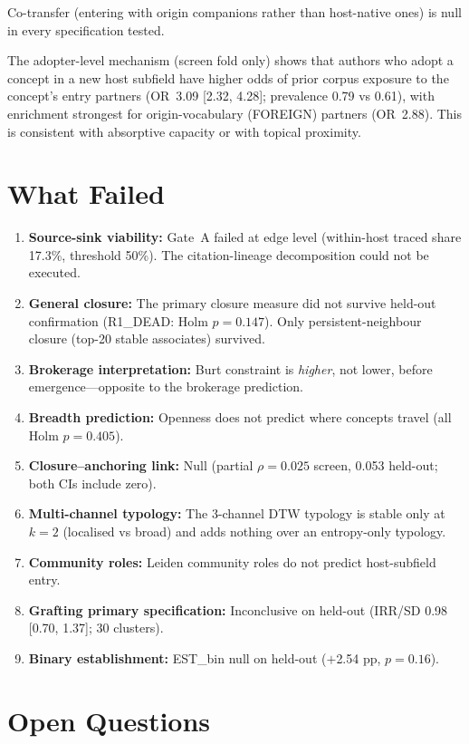 \documentclass[11pt,letterpaper]{article}
\begin{document}
Co-transfer (entering with origin companions rather than host-native ones) is null in every specification tested.

The adopter-level mechanism (screen fold only) shows that authors who adopt a concept in a new host subfield have higher odds of prior corpus exposure to the concept's entry partners (OR~3.09 [2.32, 4.28]; prevalence 0.79 vs 0.61), with enrichment strongest for origin-vocabulary (FOREIGN) partners (OR~2.88). This is consistent with absorptive capacity or with topical proximity.

\section*{What Failed}

\begin{enumerate}
\setlength{\itemsep}{2pt}
\emergencystretch=1em
\item \textbf{Source-sink viability:} Gate~A failed at edge level (within-host traced share 17.3\%, threshold 50\%). The citation-lineage decomposition could not be executed.
\item \textbf{General closure:} The primary closure measure did not survive held-out confirmation (R1\_DEAD: Holm $p = 0.147$). Only persistent-neighbour closure (top-20 stable associates) survived.
\item \textbf{Brokerage interpretation:} Burt constraint is \emph{higher}, not lower, before emergence---opposite to the brokerage prediction.
\item \textbf{Breadth prediction:} Openness does not predict where concepts travel (all Holm $p = 0.405$).
\item \textbf{Closure--anchoring link:} Null (partial $\rho = 0.025$ screen, 0.053 held-out; both CIs include zero).
\item \textbf{Multi-channel typology:} The 3-channel DTW typology is stable only at $k = 2$ (localised vs broad) and adds nothing over an entropy-only typology.
\item \textbf{Community roles:} Leiden community roles do not predict host-subfield entry.
\item \textbf{Grafting primary specification:} Inconclusive on held-out (IRR/SD 0.98 [0.70, 1.37]; 30 clusters).
\item \textbf{Binary establishment:} EST\_bin null on held-out ($+$2.54 pp, $p = 0.16$).
\end{enumerate}

\section*{Open Questions}
\end{document}
